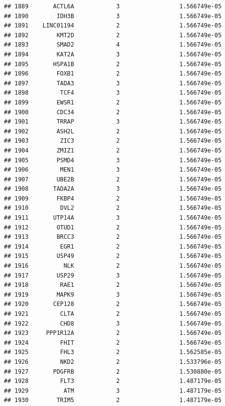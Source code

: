 \documentclass[
]{article}
\begin{document}
\begin{verbatim}
## 1889       ACTL6A            3                 1.566749e-05
## 1890        IDH3B            3                 1.566749e-05
## 1891    LINC01194            2                 1.566749e-05
## 1892        KMT2D            2                 1.566749e-05
## 1893        SMAD2            4                 1.566749e-05
## 1894        KAT2A            3                 1.566749e-05
## 1895       HSPA1B            2                 1.566749e-05
## 1896        FOXB1            2                 1.566749e-05
## 1897        TADA3            3                 1.566749e-05
## 1898         TCF4            3                 1.566749e-05
## 1899        EWSR1            2                 1.566749e-05
## 1900        CDC34            2                 1.566749e-05
## 1901        TRRAP            3                 1.566749e-05
## 1902        ASH2L            2                 1.566749e-05
## 1903         ZIC3            2                 1.566749e-05
## 1904        ZMIZ1            2                 1.566749e-05
## 1905        PSMD4            3                 1.566749e-05
## 1906         MEN1            3                 1.566749e-05
## 1907        UBE2B            2                 1.566749e-05
## 1908       TADA2A            3                 1.566749e-05
## 1909        FKBP4            2                 1.566749e-05
## 1910         DVL2            2                 1.566749e-05
## 1911       UTP14A            3                 1.566749e-05
## 1912        OTUD1            2                 1.566749e-05
## 1913        BRCC3            2                 1.566749e-05
## 1914         EGR1            2                 1.566749e-05
## 1915        USP49            2                 1.566749e-05
## 1916          NLK            2                 1.566749e-05
## 1917        USP29            3                 1.566749e-05
## 1918         RAE1            2                 1.566749e-05
## 1919        MAPK9            3                 1.566749e-05
## 1920       CEP128            2                 1.566749e-05
## 1921         CLTA            2                 1.566749e-05
## 1922         CHD8            3                 1.566749e-05
## 1923     PPP1R12A            2                 1.566749e-05
## 1924         FHIT            2                 1.566749e-05
## 1925         FHL3            2                 1.562585e-05
## 1926         NKD2            2                 1.533796e-05
## 1927       PDGFRB            2                 1.530880e-05
## 1928         FLT3            2                 1.487179e-05
## 1929          ATM            3                 1.487179e-05
## 1930        TRIM5            2                 1.487179e-05

\end{verbatim}
\end{document}
